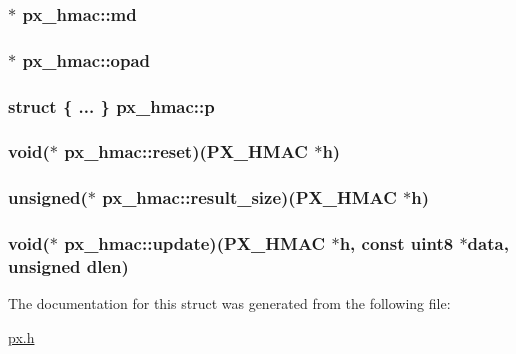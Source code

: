 \hypertarget{structpx__hmac_a03c811c1ae1050bb260e48c10fa87cb0}{
\subsubsection[{md}]{$\ast$ px\-\_\-hmac\-::md}}\label{structpx__hmac_a03c811c1ae1050bb260e48c10fa87cb0}
\hypertarget{structpx__hmac_aa16d837ed7c5cd1d54b11bb73a1b9ed6}{
\subsubsection[{opad}]{$\ast$ px\-\_\-hmac\-::opad}}\label{structpx__hmac_aa16d837ed7c5cd1d54b11bb73a1b9ed6}
\hypertarget{structpx__hmac_a9dc542fa7e54271064310f5d6780bfe7}{
\subsubsection[{p}]{\setlength{\rightskip}{0pt plus 5cm}struct \{ ... \} 			 px\-\_\-hmac\-::p}}\label{structpx__hmac_a9dc542fa7e54271064310f5d6780bfe7}
\hypertarget{structpx__hmac_a64ffc8c49352689a88434c0ebc037714}{
\subsubsection[{reset}]{\setlength{\rightskip}{0pt plus 5cm}void($\ast$ px\-\_\-hmac\-::reset)({\bf P\-X\-\_\-\-H\-M\-A\-C} $\ast$h)}}\label{structpx__hmac_a64ffc8c49352689a88434c0ebc037714}
\hypertarget{structpx__hmac_a0cb0b623751c051d891c014c9205d580}{
\subsubsection[{result\-\_\-size}]{\setlength{\rightskip}{0pt plus 5cm}unsigned($\ast$ px\-\_\-hmac\-::result\-\_\-size)({\bf P\-X\-\_\-\-H\-M\-A\-C} $\ast$h)}}\label{structpx__hmac_a0cb0b623751c051d891c014c9205d580}
\hypertarget{structpx__hmac_a0bb46e1f461f7d0300e0d8d8c9c2f306}{
\subsubsection[{update}]{\setlength{\rightskip}{0pt plus 5cm}void($\ast$ px\-\_\-hmac\-::update)({\bf P\-X\-\_\-\-H\-M\-A\-C} $\ast$h, const {\bf uint8} $\ast$data, unsigned dlen)}}\label{structpx__hmac_a0bb46e1f461f7d0300e0d8d8c9c2f306}


The documentation for this struct was generated from the following file\-:\begin{DoxyCompactItemize}
\item 
\hyperlink{px_8h}{px.\-h}\end{DoxyCompactItemize}
